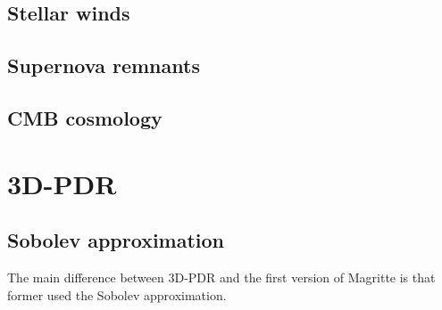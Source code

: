 \documentclass[]{article}
\begin{document}
\subsection{Stellar winds}

\subsection{Supernova remnants}

\subsection{CMB cosmology}



\newpage

\appendix

\section{3D-PDR}

\subsection{Sobolev approximation}

The main difference between 3D-PDR and the first version of Magritte is that former used the Sobolev approximation.


\newpage



\end{document}
